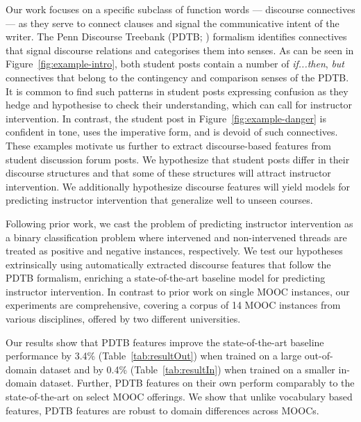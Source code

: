 \documentclass[letterpaper]{article}
\begin{document}
Our work focuses on a specific subclass of 
function words --- discourse connectives --- as they serve to 
connect clauses and signal the communicative intent of the writer. 
The Penn Discourse Treebank (PDTB; \citeauthor{Prasad2008} 
\citeyear{Prasad2008}) formalism identifies connectives 
that signal discourse relations and categorises them into senses. 
As can be seen in Figure~\ref{fig:example-intro}, both student posts 
contain a number of \textit{if...then}, \textit{but} connectives that 
belong to the contingency and comparison senses of the PDTB. It is 
common to find such patterns in student posts 
expressing confusion as they hedge and hypothesise to check their understanding,
which can call for instructor intervention. In contrast, the student post in 
Figure~\ref{fig:example-danger} is confident in tone, uses the imperative form, 
and is devoid of such connectives. These examples motivate us further to extract 
discourse-based features from student discussion forum posts. We hypothesize 
that student posts differ in their discourse structures and that some of these 
structures will attract instructor intervention. We additionally hypothesize 
discourse features will yield models for predicting instructor intervention that 
generalize well to unseen courses. 

Following prior work, we cast the problem of predicting instructor intervention
as a binary classification problem where intervened and non-intervened threads 
are treated as positive and negative instances, respectively.
We test our hypotheses extrinsically using automatically extracted discourse 
features that follow the PDTB 
formalism, enriching a state-of-the-art baseline model for predicting
instructor intervention. In contrast to prior work on single MOOC
instances, our experiments are comprehensive, covering a corpus of 14
MOOC instances from various disciplines, offered by two different
universities.

Our results show that PDTB features improve the state-of-the-art baseline 
performance by 3.4\% (Table~\ref{tab:resultOut}) when trained on a large 
out-of-domain dataset and by 0.4\% (Table~\ref{tab:resultIn}) when trained on a  
smaller in-domain dataset. Further, PDTB features on 
their own perform comparably to the state-of-the-art on select MOOC offerings. 
We show that unlike vocabulary based features, PDTB features are robust to 
domain differences across MOOCs.
\end{document}
